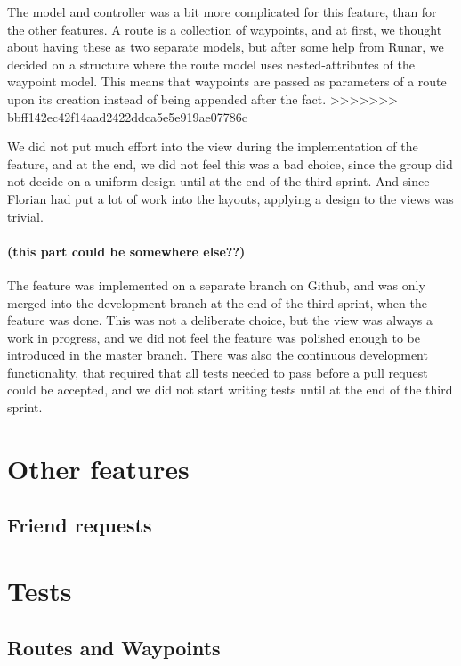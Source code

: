 \documentclass[a4paper]{article}
\begin{document}
The model and controller was a bit more complicated for this feature, than for the other features. A route is a collection of waypoints, and at first, we thought about having these as two separate models,  but after some help from Runar, we decided on a structure where the route model uses nested-attributes of the waypoint model. This means that waypoints are passed as parameters of a route upon its creation instead of being appended after the fact.
>>>>>>> bbff142ec42f14aad2422ddca5e5e919ae07786c

\noindent
We did not put much effort into the view during the implementation of the feature, and at the end, we did not feel this was a bad choice, since the group did not decide on a uniform design until at the end of the third sprint. And since Florian had put a lot of work into the layouts, applying a design to the views was trivial.\\

\noindent
\paragraph{(this part could be somewhere else??)}The feature was implemented on a separate branch on Github, and was only merged into the development branch at the end of the third sprint, when the feature was done. This was not a deliberate choice, but the view was always a work in progress, and we did not feel the feature was polished enough to be introduced in the master branch. There was also the continuous development functionality, that required that all tests needed to pass before a pull request could be accepted, and we did not start writing tests until at the end of the third sprint. 

\section{Other features}
\subsection{Friend requests}

\section{Tests}
\subsection{Routes and Waypoints}
\end{document}
